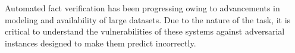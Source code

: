 Automated fact verification has been progressing owing to advancements in modeling and availability of large datasets. Due to the nature of the task, it is critical to understand the vulnerabilities of these systems against adversarial instances designed to make them predict incorrectly.